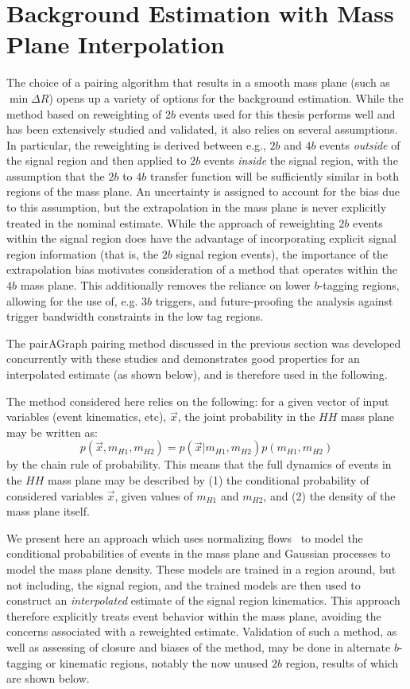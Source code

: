\section{Background Estimation with Mass Plane Interpolation}
The choice of a pairing algorithm that results in a smooth mass plane (such as $\min{\Delta R}$) 
opens up a variety of options for the background estimation. While the method based on 
reweighting of $2b$ events used for this thesis performs well and has been extensively 
studied and validated, it also relies on several assumptions. In particular, the reweighting is derived 
between e.g., $2b$ and $4b$ events \emph{outside} of the signal region and then applied to $2b$ 
events \emph{inside} the signal region, with the assumption that the $2b$ to $4b$ transfer function 
will be sufficiently similar in both regions of the mass plane. An uncertainty is assigned to 
account for the bias due to this assumption, but the extrapolation in the mass plane is never 
explicitly treated in the nominal estimate. While the approach of reweighting $2b$ events within the 
signal region does have the advantage of incorporating explicit signal region information (that is, 
the $2b$ signal region events), the importance of the extrapolation bias motivates consideration 
of a method that operates within the $4b$ mass plane. This additionally removes the reliance on lower 
$b$-tagging regions, allowing for the use of, e.g. $3b$ triggers, and future-proofing the analysis 
against trigger bandwidth constraints in the low tag regions.

The pairAGraph pairing method discussed in the previous section was developed concurrently with 
these studies and demonstrates good properties for an interpolated estimate (as shown below), and 
is therefore used in the following.

The method considered here relies on the following: for a given vector of 
input variables (event kinematics, etc), $\vec{x}$, the joint probability in the $HH$ mass 
plane may be written as:
\begin{equation}
p(\vec{x}, m_{H1}, m_{H2}) = p(\vec{x}| m_{H1}, m_{H2})p(m_{H1}, m_{H2})
\end{equation}
by the chain rule of probability. This means that the full dynamics of events 
in the $HH$ mass plane may be described by (1) the conditional probability of 
considered variables $\vec{x}$, given values of $m_{H1}$ and $m_{H2}$, and (2) the 
density of the mass plane itself. 

We present here an approach which uses normalizing flows~\cite{NormalizingFlows} to model the 
conditional probabilities of events in the mass plane and Gaussian processes to 
model the mass plane density. These models are trained in a region around, but not 
including, the signal region, and the trained models are then used to construct an 
\emph{interpolated} estimate of the signal region kinematics. This approach therefore 
explicitly treats event behavior within the mass plane, avoiding the concerns associated 
with a reweighted estimate. Validation of such a method, as well as assessing of closure and 
biases of the method, may be done in alternate $b$-tagging or kinematic regions, notably the 
now unused $2b$ region, results of which are shown below.

